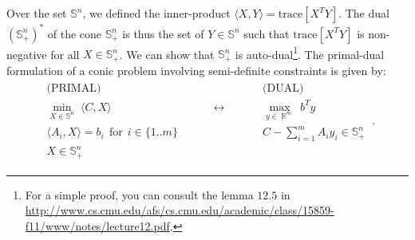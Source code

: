\documentclass[12pt,a4paper]{article}
\theoremstyle{definition}
\theoremstyle{plain}
\DeclareMathOperator{\reals}{\mathbb{R}}
\begin{document}
Over the set $\mathbb{S}^n$, we defined the inner-product $\langle X,Y \rangle = \mathrm{trace}[X^TY]$. The dual $(\mathbb{S}^n_+)^*$ of the cone $\mathbb{S}^n_+$ is thus the set of $Y\in\mathbb{S}^n$ such that $\mathrm{trace}[X^TY]$ is non-negative for all $X\in\mathbb{S}^n_+$. We can show that $\mathbb{S}^n_+$ is auto-dual\footnote{For a simple proof, you can consult the lemma $12.5$ in \url{http://www.cs.cmu.edu/afs/cs.cmu.edu/academic/class/15859-f11/www/notes/lecture12.pdf}.}. The primal-dual formulation of a conic problem involving semi-definite constraints is given by:
\begin{align*}
\: \begin{array}{ccc}
    \text{(PRIMAL)} & & \text{(DUAL)} \\
    \min_{X\in\mathbb{S}^n}\; \langle C,X \rangle & \hspace{1cm}\longleftrightarrow\hspace{1cm}~ & \max_{y\in\reals^m}\; b^Ty \\
    \langle A_i,X \rangle = b_i \:\:\text{for}\:\:i\in\lbrace 1..m\rbrace & & C -\sum_{i=1}^m A_iy_i \in \mathbb{S}^n_+ \\
    X \in \mathbb{S}^n_+ & &
\end{array} \:.
\end{align*}
\end{document}

